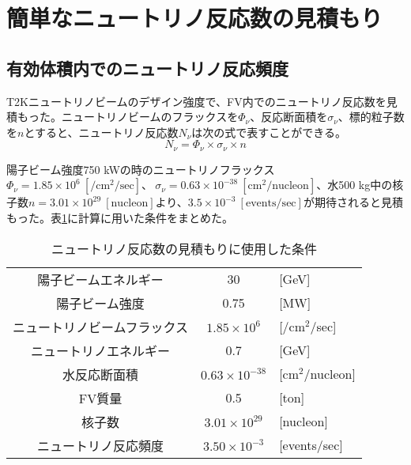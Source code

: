 \documentclass[11pt]{ltjsreport}
\newcommand{\cmcm}{cm$^{2}$}
\newcommand{\tabref}[1]{表\ref{#1}}
\begin{document}
\section{簡単なニュートリノ反応数の見積もり}

\subsection{有効体積内でのニュートリノ反応頻度}
T2Kニュートリノビームのデザイン強度で、FV内でのニュートリノ反応数を見積もった。ニュートリノビームのフラックスを$\Phi_{\nu}$、反応断面積を$\sigma_{\nu}$、標的粒子数を$n$とすると、ニュートリノ反応数$N_{\nu}$は次の式で表すことができる。
\begin{equation}
N_{\nu}  = \Phi_{\nu} \times \sigma_{\nu} \times n
\end{equation}

陽子ビーム強度750 kWの時のニュートリノフラックス$\Phi_{\nu}=1.85 \times 10^{6}\ \mathrm{[/cm^{2}/sec]}$、$\ \sigma_{\nu}=0.63 \times 10^{-38}\ \mathrm{[cm^{2}/nucleon]}$、水500 kg中の核子数$n=3.01\times10^{29}\ \mathrm{[nucleon]}$より、$3.5\times10^{-3}\ \mathrm{[events/sec]}$が期待されると見積もった。\tabref{EventRateEstimation}に計算に用いた条件をまとめた。

\begin{table}[htbp]
\caption{ニュートリノ反応数の見積もりに使用した条件}
\begin{center}
\begin{tabular}{ccl}
\hline \hline
陽子ビームエネルギー & 30 & [GeV]\\
陽子ビーム強度 & 0.75 &[MW] \\
ニュートリノビームフラックス & $1.85 \times 10^{6}$ & [/\cmcm /sec] \\
ニュートリノエネルギー & 0.7 & [GeV]\\
水反応断面積 & $0.63 \times 10^{-38}$ & [\cmcm/nucleon]\\
FV質量 & 0.5 & [ton] \\
核子数 & $3.01\times10^{29}$ & [nucleon]\\
\hline
ニュートリノ反応頻度 & $3.50 \times 10^{-3}$ & [events/sec]\\
\hline \hline
\end{tabular}
\end{center}
\label{EventRateEstimation}
\end{table}%
\end{document}
